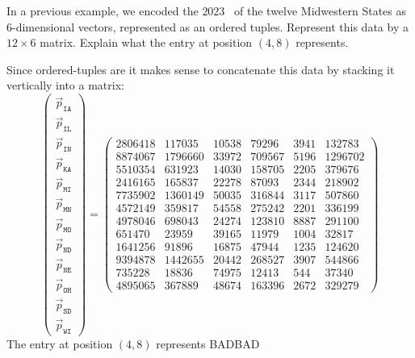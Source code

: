 \documentclass{ximera}
\begin{document}
\begin{example} %
  In a previous example, we encoded the $2023$
  ~of
  the twelve Midwestern States as $6$-dimensional vectors, represented
  as an ordered tuples. Represent this data by a $12\times 6$
  matrix. Explain what the entry at position $(4,8)$ represents.
  \begin{explanation}
  Since ordered-tuples are  it makes sense to
  concatenate this data by stacking it vertically into a matrix:
  \[
  \begin{pmatrix}
  \vec{p}_{\texttt{IA}} \\
  \vec{p}_{\texttt{IL}} \\
  \vec{p}_{\texttt{IN}} \\
  \vec{p}_{\texttt{KA}} \\
  \vec{p}_{\texttt{MI}} \\
  \vec{p}_{\texttt{MN}} \\
  \vec{p}_{\texttt{MO}} \\
  \vec{p}_{\texttt{ND}} \\
  \vec{p}_{\texttt{NE}} \\
  \vec{p}_{\texttt{OH}} \\
  \vec{p}_{\texttt{SD}} \\
  \vec{p}_{\texttt{WI}}
  \end{pmatrix}
  =
  \begin{pmatrix}
  2806418 & 117035 & 10538 & 79296 & 3941 & 132783\\
  8874067 & 1796660 & 33972 & 709567 & 5196 & 1296702\\
  5510354 & 631923 & 14030 & 158705 & 2205 & 379676\\
  2416165 & 165837 & 22278 & 87093 & 2344 & 218902\\
  7735902 & 1360149 & 50035 & 316844 & 3117 & 507860\\
  4572149 & 359817 & 54558 & 275242 & 2201 & 336199\\
  4978046 & 698043 & 24274 & 123810 & 8887 & 291100\\
  651470 & 23959 & 39165 & 11979 & 1004 & 32817\\
  1641256 & 91896 & 16875 & 47944 & 1235 & 124620\\
  9394878 & 1442655 & 20442 & 268527 & 3907 & 544866\\
  735228 & 18836 & 74975 & 12413 & 544 & 37340\\
  4895065 & 367889 & 48674 & 163396 & 2672 & 329279
  \end{pmatrix}
  \]
  The entry at position $(4,8)$ represents BADBAD
  \end{explanation}
\end{example}
\end{document}
